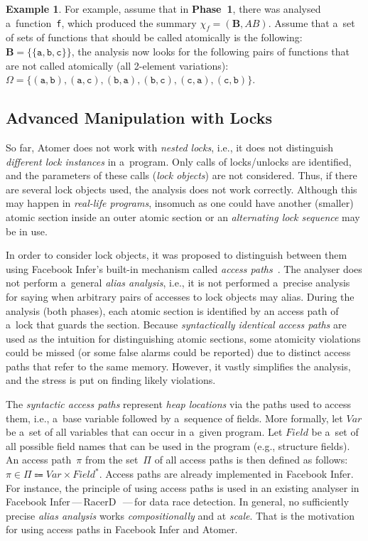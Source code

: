 \documentclass{ExcelAtFIT}
\theoremstyle{definition}
\newtheorem{example}{Example}[section]
\begin{document}
\begin{example}
    \sloppy
    For example, assume that in \textbf{Phase~1}, there was analysed a~function~\texttt{f}, which produced the summary $ \chi_f = {(\boldsymbol{B}, AB)} $. Assume that a~set of sets of functions that should be called atomically is the following: $ \boldsymbol{B} = \{{\{\mathtt{a}, \mathtt{b}, \mathtt{c}\}}\} $, the analysis now looks for the following pairs of functions that are not called atomically (all 2-element variations): $ \Omega = \{{(\mathtt{a}, \mathtt{b})}, {(\mathtt{a}, \mathtt{c})}, {(\mathtt{b}, \mathtt{a})}, {(\mathtt{b}, \mathtt{c})}, {(\mathtt{c}, \mathtt{a})}, {(\mathtt{c}, \mathtt{b})}\} $.
\end{example}


\subsection{Advanced Manipulation with Locks}

So far, Atomer does not work with \emph{nested locks}, i.e., it does not distinguish \emph{different lock instances} in a~program. Only calls of locks/unlocks are identified, and the parameters of these calls (\emph{lock objects}) are not considered. Thus, if there are several lock objects used, the analysis does not work correctly. Although this may happen in \emph{real-life programs}, insomuch as one could have another (smaller) atomic section inside an outer atomic section or an \emph{alternating lock sequence} may be in use.

In order to consider lock objects, it was proposed to distinguish between them using Facebook Infer's built-in mechanism called \emph{access paths}~\cite{accessPath}. The analyser does not perform a~general \emph{alias analysis}, i.e., it is not performed a~precise analysis for saying when arbitrary pairs of accesses to lock objects may alias. During the analysis (both phases), each atomic section is identified by an access path of a~lock that guards the section. Because \emph{syntactically identical access paths} are used as the intuition for distinguishing atomic sections, some atomicity violations could be missed (or some false alarms could be reported) due to distinct access paths that refer to the same memory. However, it vastly simplifies the analysis, and the stress is put on finding likely violations.

The \emph{syntactic access paths} represent \emph{heap locations} via the paths used to access them, i.e., a~base variable followed by a~sequence of fields. More formally, let $ Var $ be a~set of all variables that can occur in a~given program. Let $ Field $ be a~set of all possible field names that can be used in the program (e.g., structure fields). An access path~$ \pi $ from the set~$ \Pi $ of all access paths is then defined as follows: $ \pi \in \Pi \Coloneqq Var \times Field^* $. Access paths are already implemented in Facebook Infer. For instance, the principle of using access paths is used in an existing analyser in Facebook Infer\,---\,RacerD~\cite{racerD}\,---\,for data race detection. In general, no sufficiently precise \emph{alias analysis} works \emph{compositionally} and at \emph{scale}. That is the motivation for using access paths in Facebook Infer and Atomer.
\end{document}
